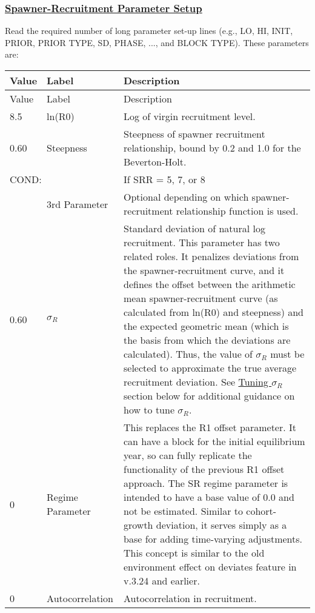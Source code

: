 \subsubsection[Spawner-Recruitment Parameter Setup]{\protect\hyperlink{SRRParam}{Spawner-Recruitment Parameter Setup}}
Read the required number of long parameter set-up lines (e.g., LO, HI, INIT, PRIOR, PRIOR TYPE, SD, PHASE, ..., and BLOCK TYPE). These parameters are:
\begin{longtable}{p{1cm} p{3cm} p{11cm}}
	\hline
	Value & Label & Description \Tstrut\Bstrut\\
	\hline
	\endfirsthead

	\hline
	Value & Label & Description \Tstrut\Bstrut\\
	\hline
	\endhead
	\hline
	\endfoot
	\endlastfoot

	8.5 & ln(R0) & Log of virgin recruitment level. \Tstrut\Bstrut\\
	\hline

	0.60 \Tstrut & Steepness & Steepness of spawner recruitment relationship, bound by 0.2 and 1.0 for the Beverton-Holt. \Bstrut\\

	\multicolumn{2}{l}{COND:} \Tstrut & If SRR = 5, 7, or 8 \\
	& 3rd Parameter & Optional depending on which spawner-recruitment relationship function is used. \Bstrut\\
	\hline

	0.60 \Tstrut & $\sigma_R$ & Standard deviation of natural log recruitment. This parameter has two related roles. It penalizes deviations from the spawner-recruitment curve, and it defines the offset between the arithmetic mean spawner-recruitment curve (as calculated from ln(R0) and steepness) and the expected geometric mean (which is the basis from which the deviations are calculated). Thus, the value of $\sigma_R$ must be selected to approximate the true average recruitment deviation. See \hyperlink{TuneSigmaR}{Tuning $\sigma_R$} section below for additional guidance on how to tune $\sigma_R$. \Bstrut\\
	\hline

	0 \Tstrut & Regime Parameter & This replaces the R1 offset parameter. It can have a block for the initial equilibrium year, so can fully replicate the functionality of the previous R1 offset approach. The SR regime parameter is intended to have a base value of 0.0 and not be estimated. Similar to cohort-growth deviation, it serves simply as a base for adding time-varying adjustments. This concept is similar to the old environment effect on deviates feature in v.3.24 and earlier. \Bstrut\\
	\hline

	0 & Autocorrelation & Autocorrelation in recruitment. \Tstrut\Bstrut\\
	\hline
\end{longtable}


